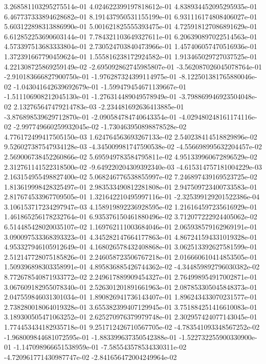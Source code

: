 3.268581103295275514e-01
4.024622399197818612e-01
4.838934452095295935e-01
6.467737333894628682e-01
8.191437950531155199e-01
6.931116174808406027e-01
5.603122898313886990e-01
5.001621825555393475e-01
4.725918127086891629e-01
6.612852253690603144e-01
7.784321103649327611e-01
6.206390897022514563e-01
4.573397513683333804e-01
2.730524703840473966e-01
1.457406057470516936e-01
1.372391667790459624e-01
1.555816238172924582e-01
1.913465029727037525e-01
4.221308725869259149e-02
-2.695092862745985807e-01
-3.562087026045078764e-01
-2.910183666827900750e-01
-1.976287324399114975e-01
-8.122501381765880046e-02
-1.043041642639692679e-01
-1.599479454671139667e-01
-1.511106908212045130e-01
-1.276314489049578949e-01
-3.798869946923504048e-02
2.132765647479214783e-03
-2.234481692636413885e-01
-3.876898539629712870e-01
-2.090584784740643354e-01
-4.029480248161174116e-02
-2.997749660259932045e-02
-1.730463950898878528e-02
4.776172499417505150e-03
1.624764563693267133e-02
2.540238414518829896e-02
9.526027387547934128e-03
-4.345009981747590538e-02
-4.556698995632204457e-02
2.569006738452260866e-02
5.695949783584795811e-02
4.951339960672896529e-02
2.312761141522318500e-02
-9.649220204309392340e-03
-4.615314757181004229e-03
2.163154955498827400e-02
5.068246776538855997e-02
7.246897439169523725e-02
1.813619998428325497e-01
2.983533490812281808e-01
2.947509723400733583e-01
2.817674533967709505e-01
1.321642210495997116e-01
-2.325399129201522386e-04
3.106153717234297947e-03
4.158919892236928595e-02
1.216164597235616929e-01
1.461865256178232764e-01
6.935376150461880496e-02
3.712077222924405062e-02
6.514485428020035107e-02
1.169762111003684046e-01
2.065938579162969191e-01
3.090097533368393323e-01
4.345282147664177863e-01
4.867241594331019328e-01
4.953327946105912649e-01
4.168026578432408868e-01
3.062513392627581599e-01
2.512147728075185826e-01
2.246058723506767218e-01
2.016660610414853505e-01
1.509396898303358991e-01
4.895836885426744362e-02
-4.344859892796030382e-02
8.772678540871933772e-02
2.249617889909454327e-01
2.764998954917002871e-01
3.067609182955078340e-01
2.526301201891661963e-01
2.087853305045848373e-01
2.047559846031301034e-01
1.890826941736143407e-01
1.896243433070231577e-01
2.738280018064019328e-01
3.655382399407129945e-01
3.751884251416610083e-01
3.189300505471063252e-01
2.625270976379979748e-01
2.302957424077143045e-01
1.774453434182935718e-01
9.251712426710567705e-02
-4.783541093348567252e-02
-1.968009844681072595e-01
-1.883399637350542388e-01
-1.522732255900330900e-01
-1.147098966651538959e-01
-7.585543578534330311e-02
-4.720961771430987747e-02
-2.841656472004249964e-02
